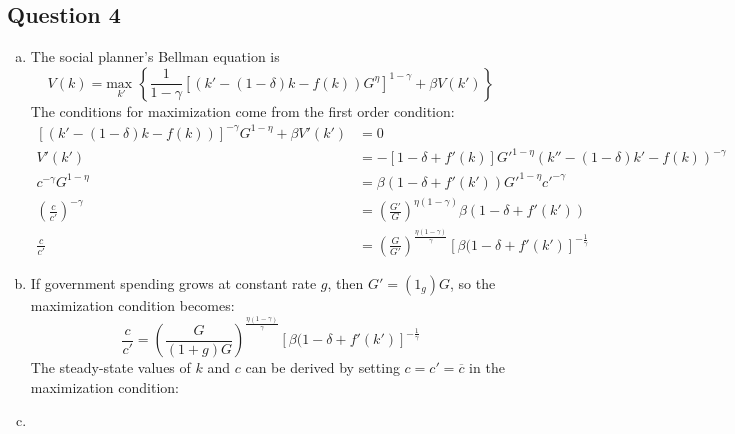 \documentclass{article}
\newcommand{\usmax}[1]{\underset{#1}{\text{max }}}
\begin{document}
\subsection*{Question 4}

\begin{enumerate}[(a)]
	\item The social planner's Bellman equation is
		\[
			V(k) = \usmax{k'}\left\{\frac{1}{1-\gamma}\left[(k'-(1-\delta)k-f(k))G^\eta\right]^{1-\gamma} + \beta V(k')\right\}
		\]
		The conditions for maximization come from the first order condition:
		\begin{align*}
			\left[\left(k'-(1-\delta)k-f(k)\right)\right]^{-\gamma}G^{1-\eta}+\beta V'(k') &= 0	\\
			V'(k') &= -\left[1-\delta+f'(k)\right]G'^{1-\eta}\left(k''-(1-\delta)k'-f(k)\right)^{-\gamma}	\\
			c^{-\gamma}G^{1-\eta} &= \beta(1-\delta + f'(k'))G'^{1-\eta}c'^{-\gamma}	\\
			\left(\frac{c}{c'}\right)^{-\gamma} &= \left(\frac{G'}{G}\right)^{\eta(1-\gamma)}\beta\left(1-\delta+f'(k')\right)	\\
			\frac{c}{c'} &= \left(\frac{G}{G'}\right)^{\frac{\eta(1-\gamma)}{\gamma}}\left[\beta(1-\delta+f'(k')\right]^{-\frac{1}{\gamma}}
		\end{align*}
	
	\item If government spending grows at constant rate $g$, then $G'=(1_g)G$, so the maximization condition becomes:
		\[
			\frac{c}{c'} = \left(\frac{G}{(1+g)G}\right)^{\frac{\eta(1-\gamma)}{\gamma}}\left[\beta(1-\delta+f'(k')\right]^{-\frac{1}{\gamma}}
		\]
		The steady-state values of $k$ and $c$ can be derived by setting $c=c'=\overline{c}$ in the maximization condition:
	
	\item 
	
\end{enumerate}

\end{document}
